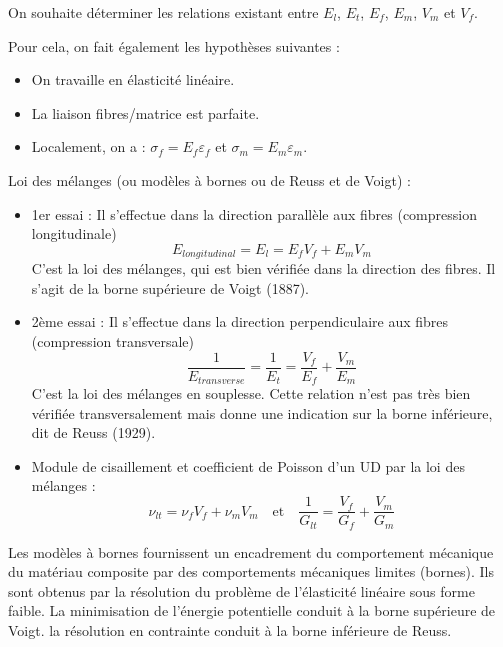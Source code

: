 \medskip
On souhaite déterminer les relations existant entre $E_l$, $E_t$, $E_f$, $E_m$, $V_m$ et $V_f$.

\medskip
Pour cela, on fait également les hypothèses suivantes :
\begin{itemize}
   \item On travaille en élasticité linéaire.
   \item La liaison fibres/matrice est parfaite.
   \item Localement, on a : $\sigma_f = E_f \varepsilon_f$  et $\sigma_m = E_m \varepsilon_m$.
\end{itemize}

\medskip
Loi des mélanges (ou modèles à bornes ou de Reuss et de Voigt) :
\begin{itemize}
	\item 1er essai : Il s'effectue dans la direction parallèle aux fibres (compression longitudinale)
		\begin{equation} E_{longitudinal}=E_l=E_fV_f+E_mV_m \end{equation}
		C'est la loi des mélanges, qui est bien vérifiée dans la direction des fibres.
		Il s'agit de la borne supérieure de Voigt (1887).
	\item 2ème essai : Il s'effectue dans la direction perpendiculaire aux fibres (compression transversale)
		\begin{equation}\dfrac1{E_{transverse}}=\dfrac1{E_t} = \dfrac{V_f}{E_f}+\dfrac{V_m}{E_m}\end{equation}
		C'est la loi des mélanges en souplesse.
		Cette relation n'est pas très bien vérifiée transversalement mais donne une
		indication sur la borne inférieure, dit de Reuss (1929).
	\item Module de cisaillement et coefficient de Poisson
		d'un UD par la loi des mélanges :
		\begin{equation}\nu_{lt}=\nu_fV_f+\nu_mV_m\quad\text{et}\quad\dfrac1{G_{lt}} = \dfrac{V_f}{G_f}+\dfrac{V_m}{G_m}\end{equation}
\end{itemize}

\medskip
Les modèles à bornes fournissent un encadrement du comportement mécanique du matériau composite
par des comportements mécaniques limites (bornes).
Ils sont obtenus par la résolution du problème de l'élasticité linéaire sous forme faible.
La minimisation de l'énergie potentielle conduit à la borne supérieure de Voigt.
la résolution en contrainte conduit à la borne inférieure de Reuss.

